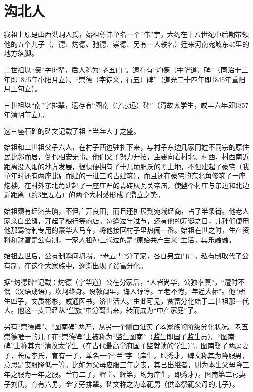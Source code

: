 \documentclass[../../dazhuan.tex]{subfiles}
\begin{document}
	\chapter*{沟北人}
	
我祖上原是山西洪洞人氏，始祖尊讳单名一个“伟”字，大约在十八世纪中后期带领他的五个儿子（广德、灼德、驰德、崇德、另有一人轶名）迁来河南宛城东45里的地方落脚。

二世祖以“德”字排辈，后人称为“老五门”。遗存有“灼德（字华道）碑”（同治十三年即1875年小阳月立）、“崇德（字徒义，行五）碑”（道光二十四年即1845年重阳月上旬立）。

三世祖以“南”字排辈，遗存有“图南（字志远）碑”（清故太学生，咸丰六年即1857年清明节立）。

这三座石碑的碑文记载了祖上当年人丁之盛。

始祖和二世祖父子六人，在村子西边驻扎下来，与村子东边几家同姓不同宗的原住民比邻而居，倒也相安无事。他们父子努力开拓，主要向着村北、村西、村西南近距离没人烟的地方发展，很快便拥有了十几顷肥沃的黑土地，不但建起了豪宅（我童年时还有两座比肩而建的一进三的古建筑），而且还在豪宅的东北角修筑了一座炮楼，在村外东北角建起了一座庄严的青砖灰瓦关帝庙，使整个村庄与东边和北边近距离（约3里左右）的两个大村落形成了鼎立之势。

始祖颇有经济头脑，不但广开良田，而且还扩展到宛城经商，占了半条街。他老人家亲自坐镇，开起了粮行等商店。每逢过年过节，还有他的寿诞之日，儿孙们便用他那驾特制专用的豪华大马车，将他接回村子里热闹一番。始祖在世之时，生产资料和财富是公有制，一家人祖孙三代过的是“原始共产主义”生活，其乐融融。

始祖去世后，公有制瞬间坍塌。“老五门”分了家，各自另立门户，私有制取代了公有制。在这个大家族中，逐渐出现了贫富分化。

据“灼德碑”记载：灼德（字华道）公在分家后，“人皆尚华，公独率真”，“遭时不偶（汉语成语），坎坷终身。设教闾里，诲人谆谆。至老不倦，年近大椿”。他“所生四子，文质彬彬，咸通医书，济世活人。”由此可见，贫富分化始于二世祖那一代人。他这一支已经从“望族”中分离出来，转而成为“中产家庭”了。

另有“崇德碑”、“图南碑”两座，从另一个侧面证实了本家族的阶级分化状况。老五崇德唯一的儿子在“崇德碑”上被称为“监生图南”（监生即国子监生员）。“图南碑”上称其为“清故太学生（在古代最高学府国子监就读的学生）”。图南娶了两房妻子，长房李氏，育有一子，单名一个“兰”字（庠生，即秀才。碑文称其为降服男，意思是丧服降低一等。比如为父母应服三年之丧，其已出继者，则为本生父母降三年之服为一年之服。兰有二子，辉堂、辉第，均为庠生，即秀才）。图南第二房妻子刘氏，育有六男，金字旁排辈。碑文称之为奉祀男（供奉祭祀父母的儿子）。
\end{document}
